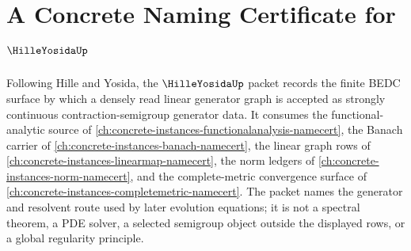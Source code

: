 \chapter{A Concrete Naming Certificate for $\HilleYosidaUp$}
\label{ch:concrete-instances-hille-yosida-namecert}

Following Hille and Yosida, the $\HilleYosidaUp$ packet records the finite BEDC surface by which a densely read linear generator graph is accepted as strongly continuous contraction-semigroup generator data. It consumes the functional-analytic source of \autoref{ch:concrete-instances-functionalanalysis-namecert}, the Banach carrier of \autoref{ch:concrete-instances-banach-namecert}, the linear graph rows of \autoref{ch:concrete-instances-linearmap-namecert}, the norm ledgers of \autoref{ch:concrete-instances-norm-namecert}, and the complete-metric convergence surface of \autoref{ch:concrete-instances-completemetric-namecert}. The packet names the generator and resolvent route used by later evolution equations; it is not a spectral theorem, a PDE solver, a selected semigroup object outside the displayed rows, or a global regularity principle.

